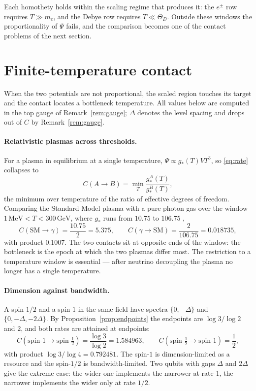 \documentclass[11pt]{article}
\theoremstyle{definition}
\theoremstyle{remark}
\begin{document}
Each homothety holds within the scaling regime that produces it: the
\(e^\pm\) row requires \(T\gg m_e\), and the Debye row requires
\(T\ll\Theta_D\).  Outside these windows the proportionality of \(\Psi\)
fails, and the comparison becomes one of the contact problems of the next
section.

\section{Finite-temperature contact}
\label{sec:contact}

When the two potentials are not proportional, the scaled region touches its
target and the contact locates a bottleneck temperature.  All values below are
computed in the top gauge of Remark~\ref{rem:gauge}; \(\Delta\) denotes the
level spacing and drops out of \(C\) by Remark~\ref{rem:gauge}.

\paragraph{Relativistic plasmas across thresholds.}
For a plasma in equilibrium at a single temperature,
\(\Psi\propto g_*(T)VT^3\), so \eqref{eq:rate} collapses to
\[
  C(A\to B)=\min_T\frac{g_*^A(T)}{g_*^B(T)},
\]
the minimum over temperature of the ratio of effective degrees of freedom.
Comparing the Standard Model plasma with a pure photon gas over the window
\(1\,\mathrm{MeV}<T<300\,\mathrm{GeV}\), where \(g_*\) runs from \(10.75\) to
\(106.75\) \cite{kolb-turner-1990},
\[
  C(\mathrm{SM}\to\gamma)=\frac{10.75}{2}=5.375,
  \qquad
  C(\gamma\to\mathrm{SM})=\frac{2}{106.75}=0.018735,
\]
with product \(0.1007\).  The two contacts sit at opposite ends of the window:
the bottleneck is the epoch at which the two plasmas differ most.  The
restriction to a temperature window is essential --- after neutrino decoupling
the plasma no longer has a single temperature.

\paragraph{Dimension against bandwidth.}
A spin-\(1/2\) and a spin-\(1\) in the same field have spectra
\(\{0,-\Delta\}\) and \(\{0,-\Delta,-2\Delta\}\).  By
Proposition~\ref{prop:endpoints} the endpoints are \(\log3/\log2\) and
\(2\), and both rates are attained at endpoints:
\[
  C(\text{spin-}1\to\text{spin-}\tfrac12)=\frac{\log3}{\log2}=1.584963,
  \qquad
  C(\text{spin-}\tfrac12\to\text{spin-}1)=\frac12,
\]
with product \(\log3/\log4=0.792481\).  The spin-\(1\) is dimension-limited as
a resource and the spin-\(1/2\) is bandwidth-limited.  Two qubits with gaps
\(\Delta\) and \(2\Delta\) give the extreme case: the wider one implements the
narrower at rate \(1\), the narrower implements the wider only at rate
\(1/2\).
\end{document}
